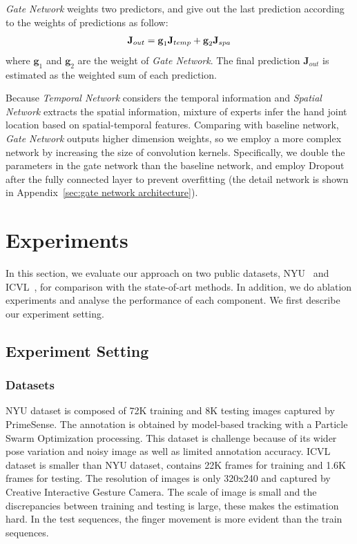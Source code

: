 \documentclass[journal,comsoc]{IEEEtran}
\let\MYoriglatexcaption\caption
\renewcommand{\caption}[2][\relax]{\MYoriglatexcaption[#2]{#2}}
\newcommand{\J}{\textbf{J}}
\begin{document}
\emph{Gate Network} weights two predictors, and give out the last prediction according to
the weights of predictions as follow:
\begin{equation}\label{eq:gate network}
\centering
\textbf{J}_{out} = \textbf{g}_1 \J_{temp} + \textbf{g}_2 \J_{spa}
\end{equation}
where $\textbf{g}_1$ and $\textbf{g}_2$ are the weight of \emph{Gate Network}. The final prediction
$\textbf{J}_{out}$ is estimated as the weighted sum of each prediction.

Because \emph{Temporal Network} considers the temporal information and \emph{Spatial Network}
extracts the spatial information, mixture of experts infer the hand joint location based on
spatial-temporal features. Comparing with baseline network, \emph{Gate Network} outputs higher
dimension weights, so we employ a more complex network by increasing the size of convolution kernels.
Specifically, we double the parameters in the gate network than the baseline network, and employ Dropout~\cite{srivastava2014dropout} after
the fully connected layer to prevent overfitting (the detail network is shown in Appendix~\ref{sec:gate network architecture}).




\section{Experiments}\label{sec:experiments}
In this section, we evaluate our approach on two public datasets, NYU~\cite{tompson2014real}
and ICVL~\cite{tang2014latent}, for comparison with the state-of-art methods. In addition, we
do ablation experiments and analyse the performance of each component. We first describe our
experiment setting.

\subsection{Experiment Setting}\label{sec:experiment setting}
\subsubsection{Datasets}\label{sec:datasets}
NYU dataset is composed of 72K training and 8K testing images captured by PrimeSense. The
annotation is obtained by model-based tracking with a Particle Swarm Optimization processing.
This dataset is challenge because of its wider pose variation and noisy image as well as limited
annotation accuracy. ICVL dataset is smaller than NYU dataset, contains 22K frames for training
and 1.6K frames for testing. The resolution of images is only 320x240 and captured by Creative Interactive
Gesture Camera. The scale of image is small and the discrepancies between training and testing is
large, these makes the estimation hard. In the test sequences, the finger movement is more evident
than the train sequences.
\end{document}
